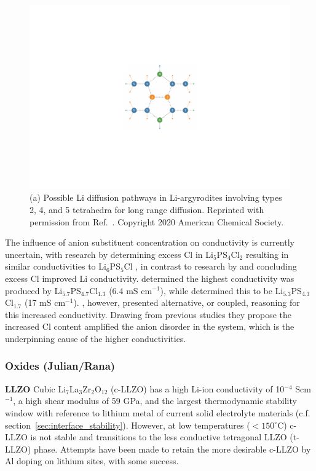 \documentclass[../main.tex]{subfiles}
\begin{document}
\begin{figure}
    \centering
    \includegraphics[scale=0.65]{figures/diffusion_pathways.pdf}
    \caption{(a) Possible Li diffusion pathways in Li-argyrodites involving types 2, 4, and 5 tetrahedra for long range diffusion. Reprinted with permission from Ref.~. Copyright 2020 American Chemical Society.}
    \label{fig:diffusion_pathways}
\end{figure}

The influence of anion substituent concentration on conductivity is currently uncertain, with research by \citeauthor{deklerk2016} determining excess Cl in Li$_5$PS$_4$Cl$_2$ resulting in similar conductivities to Li$_6$PS$_5$Cl \cite{deklerk2016}, in contrast to research by \citeauthor{yu2019tailoring} and \citeauthor{Feng_2020} concluding excess Cl improved Li conductivity. \citeauthor{yu2019tailoring} determined the highest conductivity was produced by Li$_{5.7}$PS$_{4.7}$Cl$_{1.3}$ (6.4 mS cm$^{-1}$), \cite{yu2019tailoring,yu_superionic_2020} while \citeauthor{Feng_2020} determined this to be Li$_{5.3}$PS$_{4.3}$Cl$_{1.7}$ (17 mS cm$^{-1}$). \cite{Feng_2020} \citeauthor{Feng_2020}, however, presented alternative, or coupled, reasoning for this increased conductivity. Drawing from previous studies \cite{adeli2019,zhou_solvent-engineered_2019} they propose the increased Cl content amplified the anion disorder in the system, which is the underpinning cause of the higher conductivities.

\subsubsection{Oxides (Julian/Rana)}
\label{sec:se_oxides}
\textbf{LLZO} Cubic Li$_7$La$_3$Zr$_2$O$_{12}$ (c-LLZO) has a high Li-ion conductivity of 10$^{-4}$ Scm$^{-1}$\cite{Murugan2007}, a high shear modulus of 59 GPa\cite{Ni2012}, and the largest thermodynamic stability window with reference to lithium metal\cite{Zhu2016, Zhu2015, Binninger2020} of current solid electrolyte materials (c.f. section~\ref{sec:interface_stability}). However, at low temperatures ($<150^\circ$C) c-LLZO is not stable and transitions to the less conductive tetragonal LLZO (t-LLZO) phase.\cite{Geiger2011} Attempts have been made to retain the more desirable c-LLZO by Al doping on lithium sites, with some success.\cite{Geiger2011, Rangasamy2012}
\end{document}
